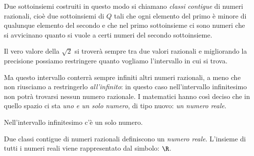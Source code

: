 Due sottoinsiemi costruiti in questo modo si chiamano \emph{classi contigue} di 
numeri razionali, cioè due sottoinsiemi di \(Q\) tali che ogni elemento del 
primo è minore di qualunque elemento del secondo e che nel primo sottoinsieme ci 
sono numeri che si avvicinano quanto si vuole a certi numeri del secondo 
sottoinsieme.

Il vero valore della  \(\sqrt{2}\) si troverà sempre tra due valori razionali e 
migliorando la precisione possiamo restringere quanto vogliamo l'intervallo in 
cui si trova. 

{\noindent
\begin{minipage}{.28\textwidth}
Ma questo intervallo conterrà sempre infiniti altri numeri 
razionali, a meno che non riusciamo a restringerlo \emph{all'infinito}: in 
questo caso nell'intervallo infinitesimo non potrà trovarsi nessun numero 
razionale.
I matematici hanno così deciso che in quello spazio ci sta \emph{uno 
e un solo numero}, di tipo nuovo: \emph{un numero reale}.
\end{minipage}
\hfill
\begin{minipage}{.70\textwidth}
\begin{inaccessibleblock} 
\begin{center}
\unoconnome 
{\footnotesize Nell'intervallo infinitesimo c'è un solo numero.} 
\end{center}
\label{fig:mandelbrot} 
\end{inaccessibleblock} 
\end{minipage}
}



Due classi contigue di numeri razionali definiscono un \emph{numero reale}. 
L'insieme di tutti i numeri reali viene rappresentato dal simbolo: \(\R\). 



